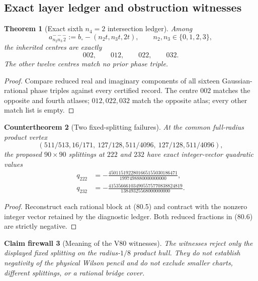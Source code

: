 \documentclass[11pt,oneside]{article}
\newtheorem{theorem}{Theorem}[section]
\newtheorem{firewall}[theorem]{Claim firewall}
\newtheorem{countertheorem}[theorem]{Countertheorem}
\theoremstyle{definition}
\theoremstyle{remark}
\begin{document}
\subsection{Exact layer ledger and obstruction witnesses}

\begin{theorem}[Exact sixth \(n_4=2\) intersection ledger]
\label{thm:newv80-intersections}
Among
\[
 a^{---}_{n_2n_3\,2}:=b_\circ-(n_2t,n_3t,2t),
 \qquad n_2,n_3\in\{0,1,2,3\},                         \tag{80.3}
\]
the inherited centres are exactly
\[
 002,\qquad012,\qquad022,\qquad032.                    \tag{80.4}
\]
The other twelve centres match no prior phase triple.
\end{theorem}

\begin{proof}
Compare reduced real and imaginary components of all sixteen
Gaussian-rational phase triples against every certified record.
The centre \(002\) matches the opposite and fourth atlases;
\(012,022,032\) match the opposite atlas; every other match list is
empty.
\end{proof}

\begin{countertheorem}[Two fixed-splitting failures]
\label{ctr:newv80-two-failures}
At the common full-radius product vertex
\[
 (511/513,16/171,\ 127/128,511/4096,\
  127/128,511/4096),                                   \tag{80.5}
\]
the proposed \(90\times90\) splittings at \(222\) and \(232\) have
exact integer-vector quadratic values
\[
\begin{aligned}
 q_{222}&=-\frac{4501151922801665155030186471}
                 {1997498880000000000},\\
 q_{232}&=-\frac{415356661034905575770838824819}
                 {13849325568000000000}.
\end{aligned}                                          \tag{80.6}
\]
\end{countertheorem}

\begin{proof}
Reconstruct each rational block at (80.5) and contract with the
nonzero integer vector retained by the diagnostic ledger.  Both
reduced fractions in (80.6) are strictly negative.
\end{proof}

\begin{firewall}[Meaning of the V80 witnesses]
\label{fire:newv80-witnesses}
The witnesses reject only the displayed fixed splitting on the
radius-\(1/8\) product hull.  They do not establish negativity of the
physical Wilson pencil and do not exclude smaller charts, different
splittings, or a rational bridge cover.
\end{firewall}
\end{document}
